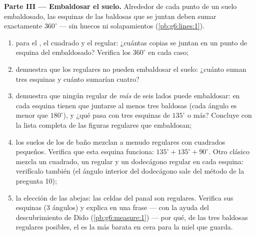\begin{problem}
\medskip
\noindent\textbf{Parte III --- Embaldosar el suelo.}
Alrededor de cada punto de un suelo embaldosado, las esquinas de las baldosas
que se juntan deben sumar exactamente $360^\circ$ --- sin huecos ni solapamientos
(\cref{pb:g6:lines:1}).
\begin{enumerate}[resume]
  \item para el , el cuadrado y el
         regular: ¿cuántas copias se juntan en un punto de esquina
        del embaldosado? Verifica los $360^\circ$ en cada caso;
  \item demuestra que los  regulares no pueden embaldosar el suelo: ¿cuánto
        suman tres esquinas y cuánto sumarían cuatro?
  \item demuestra que ningún  regular de \emph{más} de seis
        lados puede embaldosar: en cada esquina tienen que juntarse al menos tres baldosas
        (cada ángulo es menor que $180^\circ$), y ¿qué
        pasa con tres esquinas de $135^\circ$ o más? Concluye
        con la lista completa de las figuras regulares que embaldosan;
  \item los suelos de los  de baño mezclan a menudo  regulares con
        cuadrados pequeños. Verifica que esta esquina funciona:
        $135^\circ + 135^\circ + 90^\circ$. Otro clásico mezcla
        un cuadrado, un  regular y un dodecágono regular en
        cada esquina: verifícalo también (el ángulo interior del
        dodecágono sale del método de la pregunta 10);
  \item la elección de las abejas: las celdas del panal son  regulares.
        Verifica sus esquinas ($3$ ángulos) y explica en una
        frase --- con la ayuda del descubrimiento de Dido
        (\cref{pb:g6:measure:1}) --- por qué, de las tres baldosas
        regulares posibles, el  es la más barata en cera para
        la miel que guarda.
\end{enumerate}
\end{problem}
